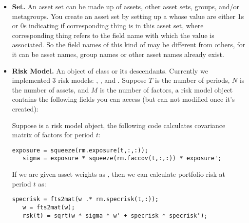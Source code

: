 \begin{itemize}
    \item \textbf{Set.}
          An asset set can be made up of assets, other asset sets, groups, and/or metagroups.
          You create an asset set by setting up a \myfints{} whose value are either 1s or 0s indicating if corresponding thing is in this asset set,
          where corresponding thing refers to the field name with which the value is associated. So the field names of this kind of \myfints{}
          may be different from others, for it can be asset names, group names or other asset names already exist.
    \item \textbf{Risk Model.}
          An object of class  or its descendants. 
          Currently we implemented 3 risk models: , , and .
          Suppose $T$ is the number of periods, $N$ is the number of assets, and $M$ is the number of factors,
          a risk model object contains the following fields you can access (but can not modified once it's created):
          Suppose  is a risk model object, the following code calculates covariance matrix of factors for period $t$:
   \begin{lstlisting}[numbers=none]
   exposure = squeeze(rm.exposure(t,:,:));
   sigma = exposure * squeeze(rm.faccov(t,:,:)) * exposure';
   \end{lstlisting}
   If we are given asset weights as , then we can calculate portfolio risk at period $t$ as:
   \begin{lstlisting}[numbers=none]
   specrisk = fts2mat(w .* rm.specrisk(t,:));
   w = fts2mat(w);
   rsk(t) = sqrt(w * sigma * w' + specrisk * specrisk');
   \end{lstlisting}


\end{itemize}
